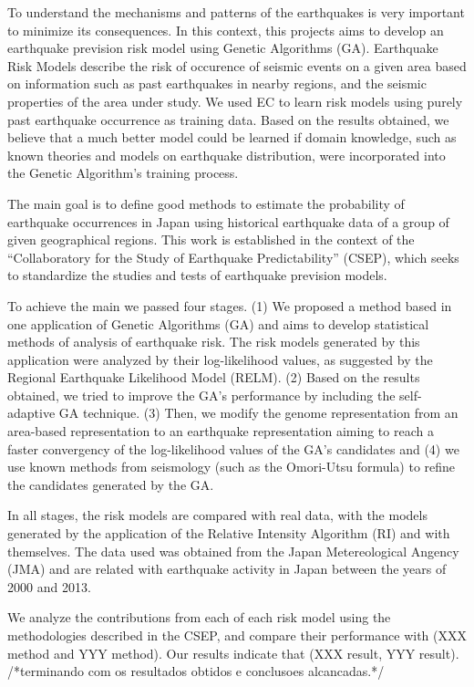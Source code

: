 To understand the mechanisms and patterns of the earthquakes is very important to minimize its consequences. In this context, this projects aims to develop an earthquake prevision risk model using Genetic Algorithms (GA). Earthquake Risk Models describe the risk of occurence of seismic events on a given area based on information such as past earthquakes in nearby regions, and the seismic properties of the area under study. We used EC to learn risk models using purely past earthquake occurrence as training data. Based on the results obtained, we believe that a much better model could be learned if domain knowledge, such as known theories and models on earthquake distribution, were incorporated into the Genetic Algorithm's training process.

The main goal is to define good methods to estimate the probability of earthquake occurrences in Japan using historical earthquake data of a group of given geographical regions. This work is established in the context of the “Collaboratory for the Study of Earthquake Predictability” (CSEP), which seeks to standardize the studies and tests of earthquake prevision models. 

To achieve the main we passed four stages. (1) We proposed a method based in one application of Genetic Algorithms (GA) and aims to develop statistical methods of analysis of earthquake risk. The risk models generated by this application were analyzed by their log-likelihood values, as suggested by the Regional Earthquake Likelihood Model (RELM). (2) Based on the results obtained, we tried to improve the GA's performance by including the self-adaptive GA technique. (3) Then, we modify the genome representation from an area-based representation to an earthquake representation aiming to reach a faster convergency of the log-likelihood values of the GA's candidates and (4) we use known methods from seismology (such as the Omori-Utsu formula) to refine the candidates generated by the GA.

In all stages, the risk models are compared with real data, with the models generated by the application of the Relative Intensity Algorithm (RI) and with themselves. The data used was obtained from the Japan Metereological Angency (JMA) and are related with earthquake activity in Japan between the years of 2000 and 2013.

We analyze the contributions from each of each risk model using the methodologies described in the CSEP, and compare their performance with (XXX method and YYY method). Our results indicate that (XXX result, YYY result).
/*terminando com os resultados obtidos e conclusoes alcancadas.*/